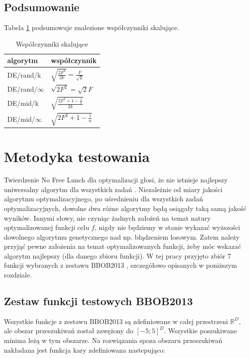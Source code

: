 \documentclass[a4paper,onecolumn,oneside,11pt,wide,floatssmall]{mwrep}
\theoremstyle{definition}
\theoremstyle{plain}%
\theoremstyle{remark}
\begin{document}
\section{Podsumowanie}

Tabela \ref{table:wspolczynniki} podsumowuje znalezione współczynniki skalujące.

\begin{table}[H]
\centering
\begin{tabular}{ l | l }
algorytm         & współczynnik \\ \hline
DE/rand/k        & $\sqrt{\frac{2F^2}{2k}} = \frac{F}{\sqrt{k}}$ \\ 
DE/rand/$\infty$ & $\sqrt{2F^2} = \sqrt{2}F$ \\ \hline
DE/mid/k         & $\sqrt{\frac{2F^2 + 1 - \frac{1}{n}}{2k}}$ \\
DE/mid/$\infty$  & $\sqrt{2F^2 + 1 - \frac{1}{n}}$ \\
\end{tabular}
\caption{Współczynniki skalujące}
\label{table:wspolczynniki}
\end{table}

\chapter{Metodyka testowania}

Twierdzenie No Free Lunch dla optymalizacji głosi, że nie istnieje najlepszy uniwersalny algorytm dla wszystkich zadań \cite{lunch}. 
Niezależnie od miary jakości algorytmu optymalizacyjnego, po uśrednieniu dla wszystkich zadań optymalizacyjnych, 
dowolne dwa różne algorytmy będą osiągały taką samą jakość wyników. Innymi słowy,
nie czyniąc żadnych założeń na temat natury optymalizowanej funkcji celu $f$, 
nigdy nie będziemy w stanie wykazać wyższości dowolnego algorytmu genetycznego nad np. błądzeniem losowym. 
Zatem należy przyjąć pewne założenia na temat optymalizowanych funkcji, żeby móc wskazać algorytm najlepszy (dla danego zbioru funkcji).
W tej pracy przyjęto zbiór 7 funkcji wybranych z zestawu BBOB2013 \cite{noiseless}, szczegółowo opisanych w poniższym rozdziale.

\section{Zestaw funkcji testowych BBOB2013}
\label{sec:zestaw}

Wszystkie funkcje z zestawu BBOB2013 są zdefiniowane w całej przestrzeni $\mathbb{R}^D$, ale obszar
przeszukiwań został zawężony do $[-5; 5]^D$. Wszystkie poszukiwane minima leżą w tym obszarze.
Na rozwiązania spoza obszaru przeszukiwań nakładana jest funkcja kary zdefiniowana nastepująco: 
\end{document}
